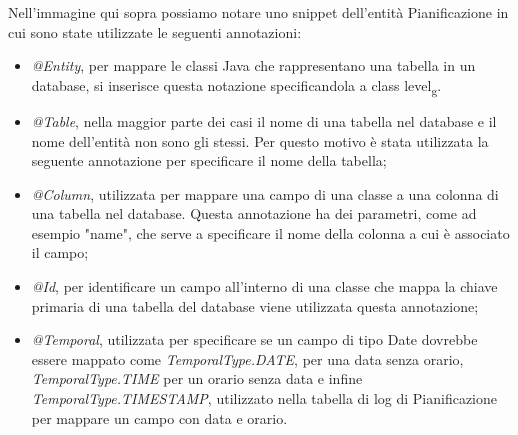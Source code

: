 \noindent Nell'immagine qui sopra possiamo notare uno snippet dell'entità Pianificazione in cui sono state utilizzate le seguenti annotazioni:
\begin{itemize}
\item \textit{@Entity}, per mappare le classi Java che rappresentano una tabella in un database, si inserisce questa notazione specificandola a class level\textsubscript{g}.
\item \textit{@Table}, nella maggior parte dei casi il nome di una tabella nel database e il nome dell'entità non sono gli stessi. Per questo motivo è stata utilizzata la seguente annotazione per specificare il nome della tabella;
\item \textit{@Column}, utilizzata per mappare una campo di una classe a una colonna di una tabella nel database. Questa annotazione ha dei parametri, come ad esempio "name", che serve a specificare il nome della colonna a cui è associato il campo;
\item \textit{@Id}, per identificare un campo all'interno di una classe che mappa la chiave primaria di una tabella del database viene utilizzata questa annotazione;
\item \textit{@Temporal}, utilizzata per specificare se un campo di tipo Date dovrebbe essere mappato come \textit{TemporalType.DATE}, per una data senza orario, \textit{TemporalType.TIME} per un orario senza data e infine \textit{TemporalType.TIMESTAMP}, utilizzato nella tabella di log di Pianificazione per mappare un campo con data e orario.
\end{itemize}
